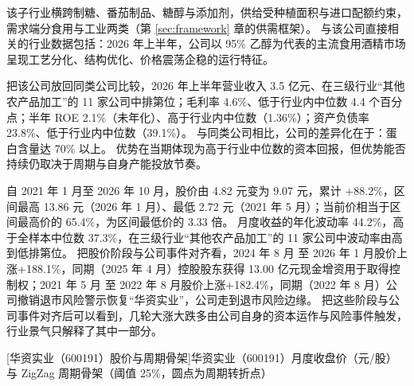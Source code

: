  该子行业横跨制糖、番茄制品、糖醇与添加剂，供给受种植面积与进口配额约束，需求端分食用与工业两类（第 \ref{sec:framework} 章的供需框架）。 与该公司直接相关的行业数据包括：2026 年上半年，公司以 95\% 乙醇为代表的主流食用酒精市场呈现工艺分化、结构优化、价格震荡企稳的运行特征。

 把该公司放回同类公司比较，2026 年上半年营业收入 3.5 亿元、在三级行业“其他农产品加工”的 11 家公司中排第位；毛利率 4.6\%、低于行业内中位数 4.4 个百分点；半年 ROE 2.1\%（未年化）、高于行业内中位数（1.36\%）；资产负债率 23.8\%、低于行业内中位数（39.1\%）。 与同类公司相比，公司的差异化在于：蛋白含量达 70\% 以上。 优势在当期体现为高于行业中位数的资本回报，但优势能否持续仍取决于周期与自身产能投放节奏。

 自 2021 年 1 月至 2026 年 10 月，股价由 4.82 元变为 9.07 元，累计 +88.2\%，区间最高 13.86 元（2026 年 1 月）、最低 2.72 元（2021 年 5 月）；当前价相当于区间最高价的 65.4\%，为区间最低价的 3.33 倍。 月度收益的年化波动率 44.2\%，高于全样本中位数 37.3\%，在三级行业“其他农产品加工”的 11 家公司中波动率由高到低排第位。 把股价阶段与公司事件对齐看，2024 年 8 月 至 2026 年 1 月股价上涨+188.1\%，同期（2025 年 4 月）控股股东获得 13.00 亿元现金增资用于取得控制权；2021 年 5 月 至 2022 年 8 月股价上涨+182.4\%，同期（2022 年 8 月）公司撤销退市风险警示恢复“华资实业”，公司走到退市风险边缘。 把这些阶段与公司事件对齐后可以看到，几轮大涨大跌多由公司自身的资本运作与风险事件触发，行业景气只解释了其中一部分。

\begin{center}
\begin{minipage}{\textwidth}\centering
{}

[华资实业（600191）股价与周期骨架]{华资实业（600191）月度收盘价（元/股）与 ZigZag 周期骨架（阈值 25\%，圆点为周期转折点）}
\end{minipage}
\end{center}

